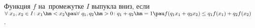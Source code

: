 \label{dv1}
    Функция $f$ на~промежутке $I$ выпукла вниз, если \\$\forall\  x_1,x_2\in I\colon x_1\hm<x_2\pau \forall\  q_1,q_2\hm>0\colon  q_1+q_2\hm=1\pau
    f(q_1x_1+q_2x_2)\leq q_1f(x_1)+q_2f(x_2)$.
